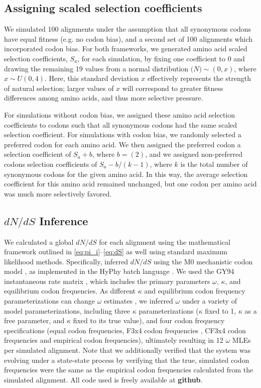 \documentclass[11pt]{article}
\begin{document}
\subsection*{Assigning scaled selection coefficients}

We simulated 100 alignments under the assumption that all synonymous codons have equal fitness (e.g. no codon bias), and a second set of 100 alignments which incorporated codon bias. For both frameworks, we generated amino acid scaled selection coefficients, $S_a$, for each simulation, by fixing one coefficient to 0 and drawing the remaining 19 values from a normal distribution $\mathcal(N)\sim(0,x)$, where $x \sim U(0,4)$. Here, this standard deviation $x$ effectively represents the strength of natural selection; larger values of $x$ will correspond to greater fitness differences among amino acids, and thus more selective pressure.


For simulations without codon bias, we assigned these amino acid selection coefficients to codons such that all synonymous codons had the same scaled selection coefficient. For simulations with codon bias, we randomly selected a preferred codon for each amino acid. We then assigned the preferred codon a selection coefficient of $S_a + b$, where $b=(2)$, and we assigned non-preferred codons selection coefficients of $S_a - b/(k-1)$, where $k$ is the total number of synonymous codons for the given amino acid. In this way, the average selection coefficient for this amino acid remained unchanged, but one codon per amino acid was much more selectively favored.



\subsection*{$dN/dS$ Inference}
We calculated a global $dN/dS$ for each alignment using the mathematical framework outlined in \eqref{eq:pi_i}--\eqref{eq:dS} as well using standard maximum likelihood methods. Specifically, inferred $dN/dS$ using the M0 mechanistic codon model \cite{Yangetal2000}, as implemented in the HyPhy batch language \cite{KosakovskyPondetal2005}. We used the GY94 instantaneous rate matrix \cite{GoldmanYang1994,NielsenYang1998}, which includes the primary parameters $\omega$, $\kappa$, and equilibrium codon frequencies. As different $\kappa$ and equilibrium codon frequency parameterizations can change $\omega$ estimates \cite{YN00, Yang2006, ZhangYu2006}, we inferred $\omega$ under a variety of model parameterizations, including three $\kappa$ parameterizations ($\kappa$ fixed to 1, $\kappa$ as a free parameter, and $\kappa$ fixed to its true value), and four codon frequency specifications (equal codon frequencies,  F3x4 codon frequencies \cite{MuseGaut1994}, CF3x4 codon frequencies \cite{Pond2010} and empirical codon frequencies), ultimately resulting in 12 $\omega$ MLEs per simulated alignment. Note that we additionally verified that the system was evolving under a state-state process by verifying that the true, simulated codon frequencies were the same as the empirical codon frequencies calculated from the simulated alignment. All code used is freely available at \textbf{github}. 
\end{document}
